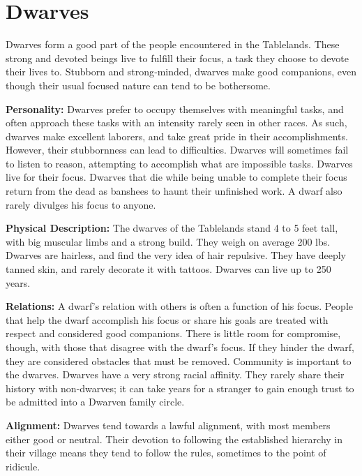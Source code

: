 \section{Dwarves}

Dwarves form a good part of the people encountered in the Tablelands. These strong and devoted beings live to fulfill their focus, a task they choose to devote their lives to. Stubborn and strong‐minded, dwarves make good companions, even though their usual focused nature can tend to be bothersome.

\textbf{Personality:} Dwarves prefer to occupy themselves with meaningful tasks, and often approach these tasks with an intensity rarely seen in other races. As such, dwarves make excellent laborers, and take great pride in their accomplishments. However, their stubbornness can lead to difficulties. Dwarves will sometimes fail to listen to reason, attempting to accomplish what are impossible tasks. Dwarves live for their focus. Dwarves that die while being unable to complete their focus return from the dead as banshees to haunt their unfinished work. A dwarf also rarely divulges his focus to anyone.

\textbf{Physical Description:} The dwarves of the Tablelands stand 4 \onehalf to 5 feet tall, with big muscular limbs and a strong build. They weigh on average 200 lbs. Dwarves are hairless, and find the very idea of hair repulsive. They have deeply tanned skin, and rarely decorate it with tattoos. Dwarves can live up to 250 years.

\textbf{Relations:} A dwarf's relation with others is often a function of his focus. People that help the dwarf accomplish his focus or share his goals are treated with respect and considered good companions. There is little room for compromise, though, with those that disagree with the dwarf's focus. If they hinder the dwarf, they are considered obstacles that must be removed. Community is important to the dwarves. Dwarves have a very strong racial affinity. They rarely share their history with non-dwarves; it can take years for a stranger to gain enough trust to be admitted into a Dwarven family circle.

\textbf{Alignment:} Dwarves tend towards a lawful alignment, with most members either good or neutral. Their devotion to following the established hierarchy in their village means they tend to follow the rules, sometimes to the point of ridicule.


